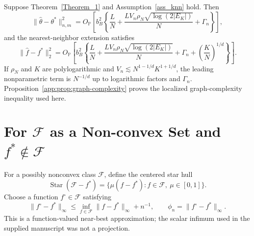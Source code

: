 \documentclass[twoside,11pt]{article}
\newenvironment{revision}{\color{revisionred}}{}
\begin{document}
\begin{theorem}\label{Theorem_5}
\begin{revision}
Suppose Theorem~\ref{Theorem_1} and Assumption~\ref{ass_knn} hold. Then
\begin{equation}
 \|\widehat\theta-\theta^*\|_{n,m}^2
 =O_{\mathbb P}\left[b_B^2\left\{
 \frac{L}{N}+
 \frac{LV_n\rho_N\sqrt{\log(2|E_K|)}}{N}
 +\Gamma_n\right\}\right],                                   \label{knn_loss_1}
\end{equation}
and the nearest-neighbor extension satisfies
\begin{equation}
 \|\widehat f-f^*\|_2^2
 =O_{\mathbb P}\left[b_B^2\left\{
 \frac{L}{N}+
 \frac{LV_n\rho_N\sqrt{\log(2|E_K|)}}{N}
 +\Gamma_n+
 \left(\frac{K}{N}\right)^{1/d}\right\}\right].             \label{eq:knn_function_rate_full}
\end{equation}
If $\rho_N$ and $K$ are polylogarithmic and
$V_n\lesssim N^{1-1/d}K^{1+1/d}$, the leading nonparametric term is
$N^{-1/d}$ up to logarithmic factors and $\Gamma_n$. Proposition~\ref{app:prop:graph-complexity} proves the localized graph-complexity inequality used here.
\end{revision}
\end{theorem}


\section{For $\mathcal F$ as a Non-convex Set and $f^*\notin\mathcal F$}

\begin{revision}
For a possibly nonconvex class $\mathcal F$, define the centered star hull
\begin{equation}
 \operatorname{Star}(\mathcal F-f^*)
 =\{\mu(f-f^*):f\in\mathcal F,\ \mu\in[0,1]\}.               \label{star_shaped}
\end{equation}
Choose a function $f^\circ\in\mathcal F$ satisfying
\begin{equation}
 \|f^\circ-f^*\|_\infty
 \le\inf_{f\in\mathcal F}\|f-f^*\|_\infty+n^{-1},
 \qquad \phi_n=\|f^\circ-f^*\|_\infty.                      \label{eq:nonconvex_projection_full}
\end{equation}
This is a function-valued near-best approximation; the scalar infimum used in the supplied manuscript was not a projection.
\end{revision}
\end{document}

